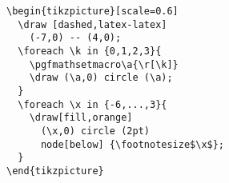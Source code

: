 \documentclass{article}
\begin{document}
\begin{codebox}
\begin{verbatim}
\begin{tikzpicture}[scale=0.6]
  \draw [dashed,latex-latex]
    (-7,0) -- (4,0);
  \foreach \k in {0,1,2,3}{
    \pgfmathsetmacro\a{\r[\k]}
    \draw (\a,0) circle (\a);
  }
  \foreach \x in {-6,...,3}{
    \draw[fill,orange]
      (\x,0) circle (2pt)
      node[below] {\footnotesize$\x$};
  }
\end{tikzpicture}
\end{verbatim}
    \tcblower
    \begin{center}
\end{center}
\end{codebox}
\end{document}
